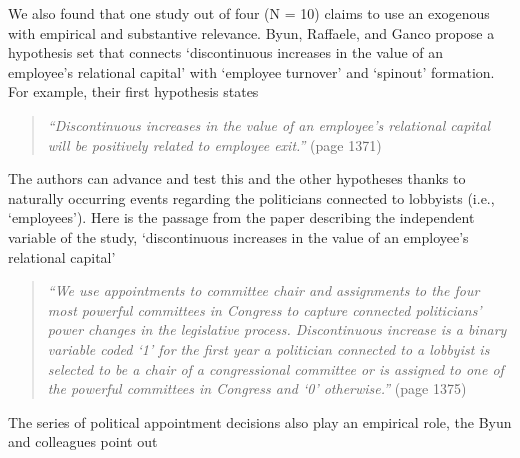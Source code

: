 \documentclass[11pt]{article}
\begin{document}
\begin{refsection}
We also found that one study out of four (N = 10) claims to use an exogenous with empirical and substantive relevance. Byun, Raffaele, and Ganco \autocite*{byun20191368} propose a hypothesis set that connects `discontinuous increases in the value of an employee's relational capital' with `employee turnover' and `spinout' formation. For example, their first hypothesis states

\begin{quote}
  \textit{
    ``Discontinuous increases in the value of an  employee's relational capital
    will be positively related to employee exit.''
  }
  (page 1371)
\end{quote}

The authors can advance and test this and the other hypotheses thanks to naturally occurring events regarding the politicians connected to lobbyists (i.e., `employees').  Here is the passage from the paper describing the independent variable of the study, `discontinuous increases in the value of an employee's relational capital'

\begin{quote}
  \textit{
    ``We use appointments to committee chair and assignments to the four most
    powerful committees in Congress to capture connected politicians' power
    changes in the legislative process. Discontinuous increase is a binary
    variable coded `1' for the first year a politician connected to a lobbyist
    is selected to be a chair of a congressional committee or is assigned to one
    of the powerful committees in Congress and `0' otherwise.''
  }
  (page 1375)
\end{quote}

The series of political appointment decisions also play an empirical role, the  Byun and colleagues point out


\end{refsection}
\end{document}
